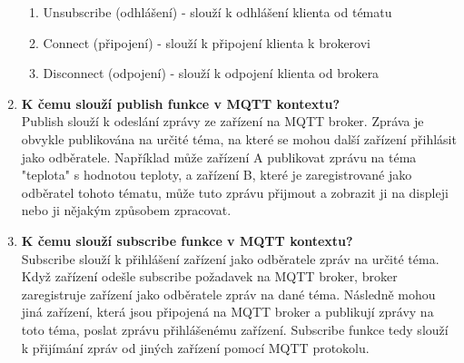 \documentclass{article}
\begin{document}
\begin{enumerate}
\begin{enumerate}
            \item {Unsubscribe (odhlášení) - slouží k odhlášení klienta od tématu}
            \item {Connect (připojení) - slouží k připojení klienta k brokerovi}
            \item {Disconnect (odpojení) - slouží k odpojení klienta od brokera}
        \end{enumerate}
        \item \textbf{K čemu slouží publish funkce v MQTT kontextu?} \\[0.6em] { Publish slouží k odeslání zprávy ze zařízení na MQTT broker. Zpráva je obvykle publikována na určité téma, na které se mohou další zařízení přihlásit jako odběratele. Například může zařízení A publikovat zprávu na téma "teplota" s hodnotou teploty, a zařízení B, které je zaregistrované jako odběratel tohoto tématu, může tuto zprávu přijmout a zobrazit ji na displeji nebo ji nějakým způsobem zpracovat.}
        \item \textbf{K čemu slouží subscribe funkce v MQTT kontextu?} \\[0.6em] { Subscribe slouží k přihlášení zařízení jako odběratele zpráv na určité téma. Když zařízení odešle subscribe požadavek na MQTT broker, broker zaregistruje zařízení jako odběratele zpráv na dané téma. Následně mohou jiná zařízení, která jsou připojená na MQTT broker a publikují zprávy na toto téma, poslat zprávu přihlášenému zařízení. Subscribe funkce tedy slouží k přijímání zpráv od jiných zařízení pomocí MQTT protokolu.}

    \end{enumerate}
\end{document}
